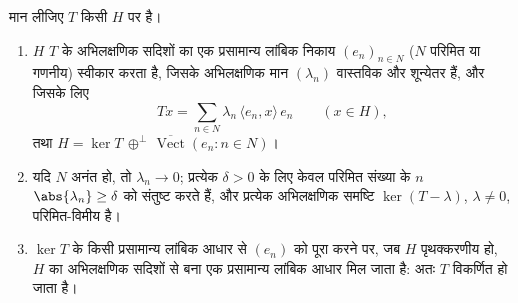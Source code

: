\begin{theorem}[संहत स्वसंलग्न संकारकों के लिए स्पेक्ट्रमी
प्रमेय]\label{thm:b3:spectral:spectral}
मान लीजिए $T$ किसी  $H$ पर   है।
\begin{enumerate}
  \item $H$ $T$ के अभिलक्षणिक सदिशों का एक प्रसामान्य लांबिक
        निकाय $(e_n)_{n \in N}$ ($N$ परिमित या गणनीय) स्वीकार करता है,
        जिसके अभिलक्षणिक मान $(\lambda_n)$ वास्तविक और शून्येतर हैं, और
        जिसके लिए
        \[
        Tx = \sum_{n\in N}\lambda_n\,\langle e_n, x\rangle\,
        e_n \qquad (x \in H),
        \]
        तथा $H = \ker T \,\oplus^\perp\,
        \overline{\operatorname{Vect}}(e_n : n \in N)$।
  \item यदि $N$ अनंत हो, तो $\lambda_n \to 0$; प्रत्येक $\delta > 0$ के लिए केवल
        परिमित संख्या के $n$ $\abs{\lambda_n} \geq \delta$ को संतुष्ट करते हैं, और
        प्रत्येक अभिलक्षणिक समष्टि $\ker(T - \lambda)$, $\lambda \neq 0$, परिमित-विमीय है।
  \item $\ker T$ के किसी प्रसामान्य लांबिक आधार से $(e_n)$ को पूरा
        करने पर, जब $H$ पृथक्करणीय हो, $H$ का अभिलक्षणिक
        सदिशों से बना एक प्रसामान्य लांबिक आधार मिल जाता है: अतः
        $T$ विकर्णित हो जाता है।
\end{enumerate}
\end{theorem}

